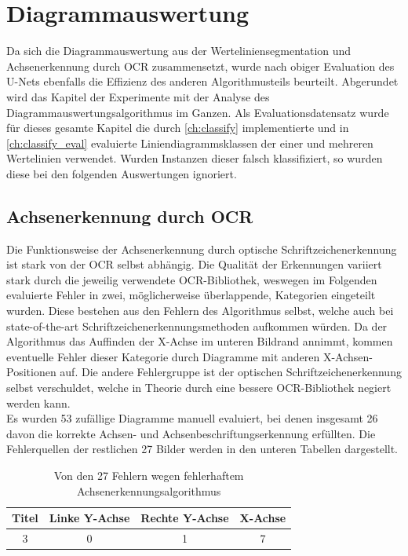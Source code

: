 \section{Diagrammauswertung}

Da sich die Diagrammauswertung aus der Werteliniensegmentation und Achsenerkennung durch OCR zusammensetzt, wurde nach obiger Evaluation des U-Nets ebenfalls die Effizienz des anderen Algorithmusteils beurteilt. Abgerundet wird das Kapitel der Experimente mit der Analyse des Diagrammauswertungsalgorithmus im Ganzen. Als Evaluationsdatensatz wurde für dieses gesamte Kapitel die durch \ref{ch:classify} implementierte und in \ref{ch:classify_eval} evaluierte Liniendiagrammsklassen der einer und mehreren Wertelinien verwendet. Wurden Instanzen dieser falsch klassifiziert, so wurden diese bei den folgenden Auswertungen ignoriert.

\subsection{Achsenerkennung durch OCR}
\label{ch:eval_ocr}

Die Funktionsweise der Achsenerkennung durch optische Schriftzeichenerkennung ist stark von der OCR selbst abhängig. Die Qualität der Erkennungen variiert stark durch die jeweilig verwendete OCR-Bibliothek, weswegen im Folgenden evaluierte Fehler in zwei, möglicherweise überlappende, Kategorien eingeteilt wurden. Diese bestehen aus den Fehlern des Algorithmus selbst, welche auch bei state-of-the-art Schriftzeichenerkennungsmethoden aufkommen würden. Da der Algorithmus das Auffinden der X-Achse im unteren Bildrand annimmt, kommen eventuelle Fehler dieser Kategorie durch Diagramme mit anderen X-Achsen-Positionen auf. Die andere Fehlergruppe ist der optischen Schriftzeichenerkennung selbst verschuldet, welche in Theorie durch eine bessere OCR-Bibliothek negiert werden kann.
\\
Es wurden 53 zufällige Diagramme manuell evaluiert, bei denen insgesamt 26 davon die korrekte Achsen- und Achsenbeschriftungserkennung erfüllten. Die Fehlerquellen der restlichen 27 Bilder werden in den unteren Tabellen dargestellt.

\begin{table}[H]
    \centering
    \begin{tabular}{|c|c|c|c|}
        \hline
        \rowcolor[HTML]{EFEFEF}
        Titel & Linke Y-Achse & Rechte Y-Achse & X-Achse \\ \hline
        3     & 0             & 1              & 7       \\ \hline
    \end{tabular}
    \caption{Von den 27 Fehlern wegen fehlerhaftem Achsenerkennungsalgorithmus}
    \label{tb:ocr1}
\end{table}


